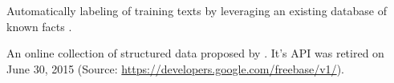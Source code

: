 
{%
  Automatically labeling of training texts by leveraging an existing database of known facts \cite{reschke2014event}.
}

{%
  An online collection of structured data proposed by \citep{bollacker2008freebase}.
  It's API was retired on June 30, 2015 (Source: \url{https://developers.google.com/freebase/v1/}).
}

